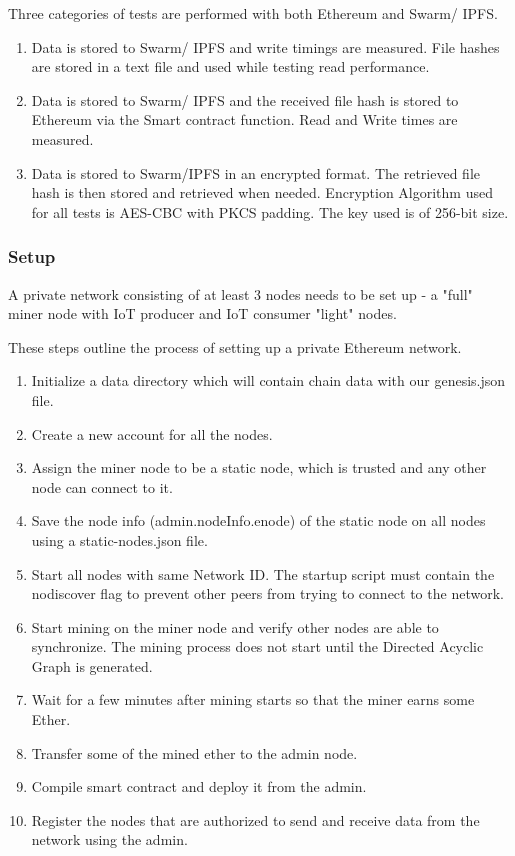 \documentclass[11pt,openright]{report}
\begin{document}
Three categories of tests are performed with both Ethereum and Swarm/ IPFS.
\begin{enumerate}
    \item Data is stored to Swarm/ IPFS and write timings are measured. File hashes are stored in a text file and used while testing read performance.
    \item Data is stored to Swarm/ IPFS and the received file hash is stored to Ethereum via the Smart contract function. Read and Write times are measured.
    \item Data is stored to Swarm/IPFS in an encrypted format. The retrieved file hash is then stored and retrieved when needed. Encryption Algorithm used for all tests is AES-CBC with PKCS padding. The key used is of 256-bit size.
\end{enumerate}

\subsubsection{Setup}
A private network consisting of at least 3 nodes needs to be set up - a "full" miner node with IoT producer and IoT consumer "light" nodes.

These steps outline the process of setting up a private Ethereum network.
\begin{enumerate}
    \item Initialize a data directory which will contain chain data with our genesis.json file.
    \item Create a new account for all the nodes.
    \item Assign the miner node to be a static node, which is trusted and any other node can connect to it. 
    \item Save the node info (admin.nodeInfo.enode) of the static node on all nodes using a static-nodes.json file.
    \item Start all nodes with same Network ID. The startup script must contain the nodiscover flag to prevent other peers from trying to connect to the network.
    \item Start mining on the miner node and verify other nodes are able to synchronize. The mining process does not start until the Directed Acyclic Graph is generated. 
    \item Wait for a few minutes after mining starts so that the miner earns some Ether.
    \item Transfer some of the mined ether to the admin node.
    \item Compile smart contract and deploy it from the admin.
    \item Register the nodes that are authorized to send and receive data from the network using the admin.
\end{enumerate}
\end{document}

